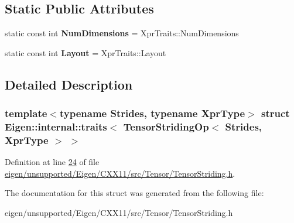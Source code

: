 \subsection*{Static Public Attributes}
\begin{DoxyCompactItemize}
\item 
\mbox{\label{struct_eigen_1_1internal_1_1traits_3_01_tensor_striding_op_3_01_strides_00_01_xpr_type_01_4_01_4_a80728d9e35961e74833c0b8263f6f6ef}} 
static const int {\bfseries Num\+Dimensions} = Xpr\+Traits\+::\+Num\+Dimensions
\item 
\mbox{\label{struct_eigen_1_1internal_1_1traits_3_01_tensor_striding_op_3_01_strides_00_01_xpr_type_01_4_01_4_a33051f7f6b68315d36224ce2e32e10ff}} 
static const int {\bfseries Layout} = Xpr\+Traits\+::\+Layout
\end{DoxyCompactItemize}


\subsection{Detailed Description}
\subsubsection*{template$<$typename Strides, typename Xpr\+Type$>$\newline
struct Eigen\+::internal\+::traits$<$ Tensor\+Striding\+Op$<$ Strides, Xpr\+Type $>$ $>$}



Definition at line \hyperlink{eigen_2unsupported_2_eigen_2_c_x_x11_2src_2_tensor_2_tensor_striding_8h_source_l00024}{24} of file \hyperlink{eigen_2unsupported_2_eigen_2_c_x_x11_2src_2_tensor_2_tensor_striding_8h_source}{eigen/unsupported/\+Eigen/\+C\+X\+X11/src/\+Tensor/\+Tensor\+Striding.\+h}.



The documentation for this struct was generated from the following file\+:\begin{DoxyCompactItemize}
\item 
eigen/unsupported/\+Eigen/\+C\+X\+X11/src/\+Tensor/\+Tensor\+Striding.\+h\end{DoxyCompactItemize}
